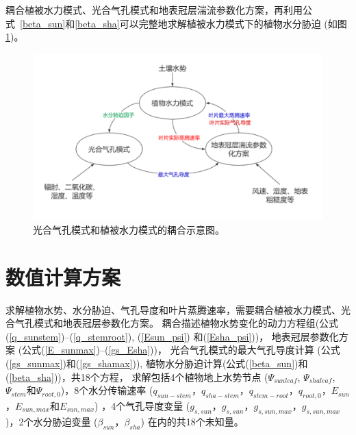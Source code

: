 耦合植被水力模式、光合气孔模式和地表冠层湍流参数化方案，再利用公式~\eqref{beta_sun}和\eqref{beta_sha}可以完整地求解植被水力模式下的植物水分胁迫 (如图 \ref{fig:光合气孔模式和植被水力模式的耦合示意图})。
{
    \begin{figure}[htbp]
    \centering
    \includegraphics{Figures/植被水力模式/光合气孔模式和植被水力模式的耦合示意图.png}
    \caption{光合气孔模式和植被水力模式的耦合示意图。}
    \label{fig:光合气孔模式和植被水力模式的耦合示意图}
    \end{figure}
}


\section{数值计算方案}\label{数值计算方案}
求解植物水势、水分胁迫、气孔导度和叶片蒸腾速率，需要耦合植被水力模式、光合气孔模式和地表冠层参数化方案。
耦合描述植物水势变化的动力方程组(公式(\ref{q_sunstem})--(\ref{q_stemroot}), (\ref{Esun_psi}) 和(\ref{Esha_psi}))，
地表冠层参数化方案 (公式(\ref{E_sunmax})--(\ref{gs_Esha}))，
光合气孔模式的最大气孔导度计算 (公式(\ref{gs_sunmax})和(\ref{gs_shamax})), 植物水分胁迫计算(公式(\ref{beta_sun})和(\ref{beta_sha}))，共18个方程，
求解包括4个植物地上水势节点 ($\Psi_{sunleaf}$, $\Psi_{shaleaf}$, $\Psi_{stem}$和$\Psi_{root,0}$)，8个水分传输速率 
($q_{sun-stem}$，$q_{sha-stem}$，$q_{stem-root}$，$q_{root,0}$，$E_{sun}$，$E_{sun,max}$和$E_{sun,max}$) ，4个气孔导度变量
 ($g_{s,sun}$，$g_{s,sun}$，$g_{s,sun,max}$，$g_{s,sun,max}$)，2个水分胁迫变量 ($\beta_{sun}$，$\beta_{sha}$) 在内的共18个未知量。

